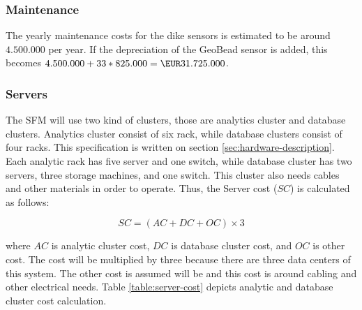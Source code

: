 \subsubsection{Maintenance}


\newcommand{\installationCosts}{412.500.000}

The yearly maintenance costs for the dike sensors is estimated to be around \EUR$4.500.000$ per year. If the depreciation of the GeoBead sensor is added, this becomes $4.500.000 + 33*825.000 = \EUR31.725.000$. 

\subsubsection{Servers}
The \gls{SFM} will use two kind of clusters, those are analytics cluster and database clusters. Analytics cluster consist of six rack, while database clusters consist of four racks. This specification is written on section \ref{sec:hardware-description}. Each analytic rack has five server and one switch, while database cluster has two servers, three storage machines, and one switch. This cluster also needs cables and other materials in order to operate. Thus, the Server cost ($SC$) is calculated as follows:

\begin{equation*}
SC = (AC + DC + OC) \times 3
\end{equation*}

where $AC$ is analytic cluster cost, $DC$ is database cluster cost, and $OC$ is other cost. The cost will be multiplied by three because there are three data centers of this system. The other cost is assumed will be  and this cost is around cabling and other electrical needs. Table \ref{table:server-cost} depicts analytic and database cluster cost calculation.

